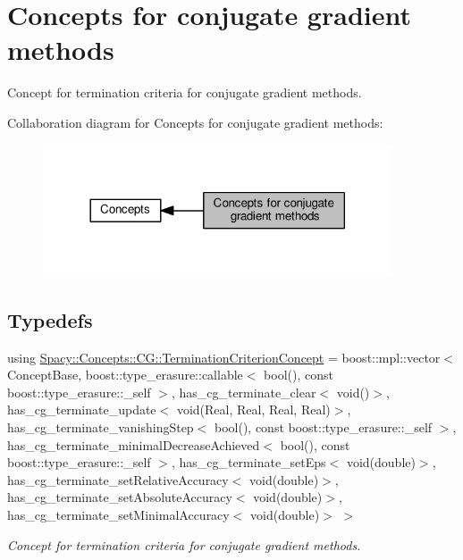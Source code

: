 \hypertarget{group__CGConceptGroup}{}\section{Concepts for conjugate gradient methods}
\label{group__CGConceptGroup}


Concept for termination criteria for conjugate gradient methods.  


Collaboration diagram for Concepts for conjugate gradient methods\+:\nopagebreak
\begin{figure}[H]
\begin{center}
\leavevmode
\includegraphics[width=293pt]{group__CGConceptGroup}
\end{center}
\end{figure}
\subsection*{Typedefs}
\begin{DoxyCompactItemize}
\item 
using \hyperlink{group__CGConceptGroup_ga6b30d103c365816efcfb038d922aef07_ga6b30d103c365816efcfb038d922aef07}{Spacy\+::\+Concepts\+::\+C\+G\+::\+Termination\+Criterion\+Concept} = boost\+::mpl\+::vector$<$ Concept\+Base, boost\+::type\+\_\+erasure\+::callable$<$ bool(), const boost\+::type\+\_\+erasure\+::\+\_\+self $>$, has\+\_\+cg\+\_\+terminate\+\_\+clear$<$ void()$>$, has\+\_\+cg\+\_\+terminate\+\_\+update$<$ void(Real, Real, Real, Real)$>$, has\+\_\+cg\+\_\+terminate\+\_\+vanishing\+Step$<$ bool(), const boost\+::type\+\_\+erasure\+::\+\_\+self $>$, has\+\_\+cg\+\_\+terminate\+\_\+minimal\+Decrease\+Achieved$<$ bool(), const boost\+::type\+\_\+erasure\+::\+\_\+self $>$, has\+\_\+cg\+\_\+terminate\+\_\+set\+Eps$<$ void(double)$>$, has\+\_\+cg\+\_\+terminate\+\_\+set\+Relative\+Accuracy$<$ void(double)$>$, has\+\_\+cg\+\_\+terminate\+\_\+set\+Absolute\+Accuracy$<$ void(double)$>$, has\+\_\+cg\+\_\+terminate\+\_\+set\+Minimal\+Accuracy$<$ void(double)$>$ $>$
\begin{DoxyCompactList}\small\item\em Concept for termination criteria for conjugate gradient methods. \end{DoxyCompactList}\end{DoxyCompactItemize}


